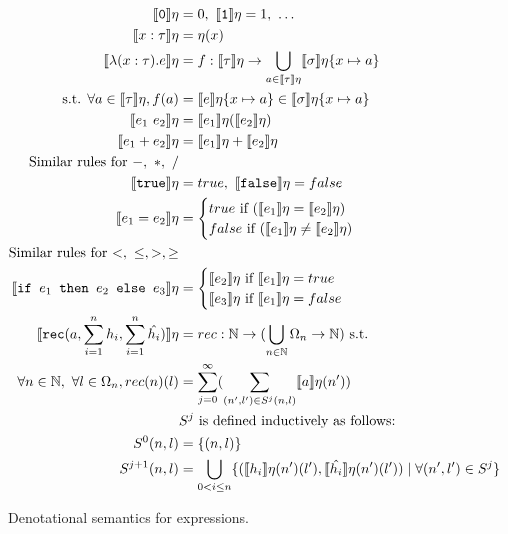  \begin{figure}
 \begin{align*}
 \llbracket \texttt{0} \rrbracket\eta &= 0, \  \llbracket \texttt{1} \rrbracket\eta = 1, \ \ldots \\
  \llbracket x : \tau \rrbracket\eta &= \eta(x) \\
  \llbracket \lambda (x : \tau) . e \rrbracket\eta &= f : \llbracket \tau \rrbracket\eta 
  \rightarrow \bigcup_{a \in \llbracket \tau \rrbracket\eta} \llbracket \sigma \rrbracket\eta\{x\mapsto a\} \\
\text{ s.t. } \forall a \in \llbracket \tau \rrbracket\eta, f(a) &= \llbracket e \rrbracket\eta\{ x \mapsto a \} 
  \in \llbracket \sigma \rrbracket\eta\{x\mapsto a\}\\
 \llbracket e_1 \ e_2 \rrbracket \eta &= \llbracket e_1 \rrbracket\eta ( \llbracket e_2 \rrbracket\eta ) \\
 \llbracket e_1 + e_2 \rrbracket\eta &= \llbracket e_1 \rrbracket\eta + \llbracket e_2 \rrbracket\eta \\
\text{Similar rules for $-, \ *, \ /$} \\
  \llbracket \texttt{true} \rrbracket\eta &= true, \ \llbracket \texttt{false} \rrbracket\eta = false \\
 \llbracket e_1 = e_2 \rrbracket\eta &= 
 \begin{cases} 
      true \text{ if } (\llbracket e_1 \rrbracket\eta = \llbracket e_2 \rrbracket\eta) \\
      false \text{  if } (\llbracket e_1 \rrbracket\eta \neq \llbracket e_2\rrbracket\eta)\\
   \end{cases} \\
\text{Similar rules for $<, \ \leq, >, \geq$} \\
  \llbracket \ifelse{e_1}{e_2}{e_3} \rrbracket \eta &= 
 \begin{cases} 
      \llbracket e_2 \rrbracket\eta \text{ if } \llbracket e_1 \rrbracket\eta = true \\
      \llbracket e_3 \rrbracket\eta \text{ if } \llbracket e_1 \rrbracket\eta = false \\ 
   \end{cases}
  \\
    \llbracket  \texttt{rec} (a,\sum_{i=1}^n h_i,\sum_{i=1}^n \hat{h_i}) \rrbracket\eta &= rec: \N \rightarrow 
    (\bigcup_{n\in \N} \Omega_n \rightarrow \N)   \text{ s.t. }  \\
  \forall n \in \N, \ 
    \forall l \in \Omega_n, 
    rec(n)(l) &= \sum_{j=0}^{\infty}(\sum_{(n',l') \in S^j(n,l)} \llbracket a \rrbracket\eta(n')) \\
    &S^j \text{ is defined inductively as follows:} \\
    S^0(n,l) &= \{(n, l)\} \\
    S^{j+1}(n,l) &= \bigcup_{0<i \leq n}\{(\llbracket h_i \rrbracket\eta(n')(l') , \llbracket \hat{h_i} \rrbracket\eta(n')(l')) \mid 
    \forall (n', l') \in S^j \}
 \end{align*}
 \caption{Denotational semantics for expressions.}
 \end{figure}

